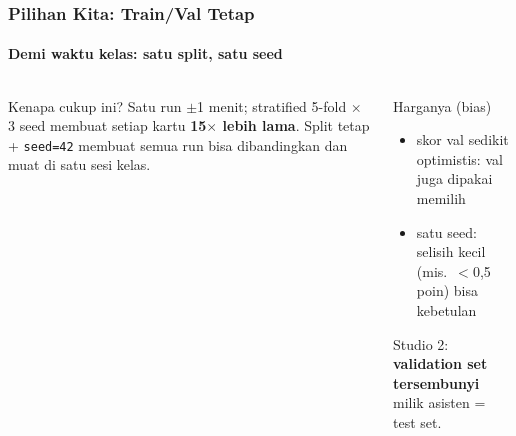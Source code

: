\documentclass[t,aspectratio=169,xcolor={dvipsnames,table}]{beamer}
\newcommand{\con}[1]{\textcolor{dlOrange}{#1}}
\begin{document}
\begin{frame}
    \frametitle{Pilihan Kita: Train/Val Tetap}
    \framesubtitle{Demi waktu kelas: satu split, satu seed}
    \footnotesize

    \begin{center}
    \end{center}

    \vspace{0.05cm}
    \begin{columns}[T]
        \begin{block}{Kenapa cukup ini?}
            Satu run $\pm$1 menit; stratified 5-fold $\times$ 3 seed membuat setiap kartu \textbf{15$\times$ lebih lama}. Split tetap + \texttt{seed=42} membuat semua run bisa dibandingkan dan muat di satu sesi kelas.
        \end{block}
        \begin{alertblock}{Harganya (bias)}
            \begin{itemize}
                \item skor val \con{sedikit optimistis}: val juga dipakai memilih
                \item satu seed: selisih kecil (mis.\ $<$0,5 poin) bisa kebetulan
            \end{itemize}
            Studio 2: \textbf{validation set tersembunyi} milik asisten = test set.
        \end{alertblock}
    \end{columns}
\end{frame}
\end{document}
